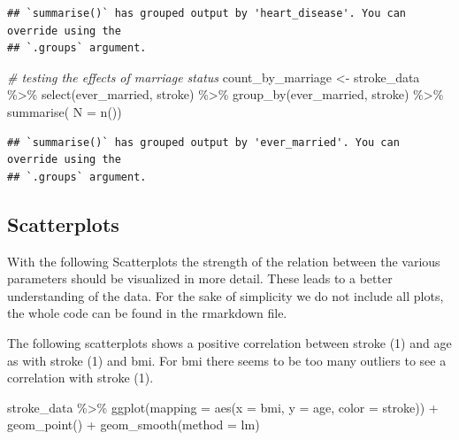 \documentclass[
]{article}
\newenvironment{Shaded}{\begin{snugshade}}{\end{snugshade}}
\newcommand{\AttributeTok}[1]{\textcolor[rgb]{0.77,0.63,0.00}{#1}}
\newcommand{\CommentTok}[1]{\textcolor[rgb]{0.56,0.35,0.01}{\textit{#1}}}
\newcommand{\FunctionTok}[1]{\textcolor[rgb]{0.00,0.00,0.00}{#1}}
\newcommand{\NormalTok}[1]{#1}
\newcommand{\OtherTok}[1]{\textcolor[rgb]{0.56,0.35,0.01}{#1}}
\newcommand{\SpecialCharTok}[1]{\textcolor[rgb]{0.00,0.00,0.00}{#1}}
\newcommand{\StringTok}[1]{\textcolor[rgb]{0.31,0.60,0.02}{#1}}
\renewcommand{\=}[1]{\stackrel{#1}{=}}
\theoremstyle{definition}
\theoremstyle{remark}
\begin{document}
\begin{verbatim}
## `summarise()` has grouped output by 'heart_disease'. You can override using the
## `.groups` argument.
\end{verbatim}

\begin{Shaded}
\begin{Highlighting}[]
\CommentTok{\# testing the effects of marriage status}
\NormalTok{count\_by\_marriage }\OtherTok{\textless{}{-}}\NormalTok{ stroke\_data }\SpecialCharTok{\%\textgreater{}\%} 
   \FunctionTok{select}\NormalTok{(ever\_married, stroke) }\SpecialCharTok{\%\textgreater{}\%} 
   \FunctionTok{group\_by}\NormalTok{(ever\_married, stroke) }\SpecialCharTok{\%\textgreater{}\%}
   \FunctionTok{summarise}\NormalTok{( }\AttributeTok{N =} \FunctionTok{n}\NormalTok{())}
\end{Highlighting}
\end{Shaded}

\begin{verbatim}
## `summarise()` has grouped output by 'ever_married'. You can override using the
## `.groups` argument.
\end{verbatim}

\hypertarget{scatterplots}{%
\subsection{Scatterplots}\label{scatterplots}}

With the following Scatterplots the strength of the relation between the various parameters should be visualized in more detail. These leads to a better understanding of the data. For the sake of simplicity we do not include all plots, the whole code can be found in the rmarkdown file.

The following scatterplots shows a positive correlation between stroke (1) and age as with stroke (1) and bmi. For bmi there seems to be too many outliers to see a correlation with stroke (1).

\begin{Shaded}
\begin{Highlighting}[]
\NormalTok{stroke\_data }\SpecialCharTok{\%\textgreater{}\%} 
  \FunctionTok{ggplot}\NormalTok{(}\AttributeTok{mapping =} \FunctionTok{aes}\NormalTok{(}\AttributeTok{x =}\NormalTok{ bmi, }\AttributeTok{y =}\NormalTok{ age, }\AttributeTok{color =}\NormalTok{ stroke)) }\SpecialCharTok{+}
  \FunctionTok{geom\_point}\NormalTok{() }\SpecialCharTok{+}
  \FunctionTok{geom\_smooth}\NormalTok{(}\AttributeTok{method =} \StringTok{\textquotesingle{}lm\textquotesingle{}}\NormalTok{)}
\end{Highlighting}
\end{Shaded}
\end{document}
